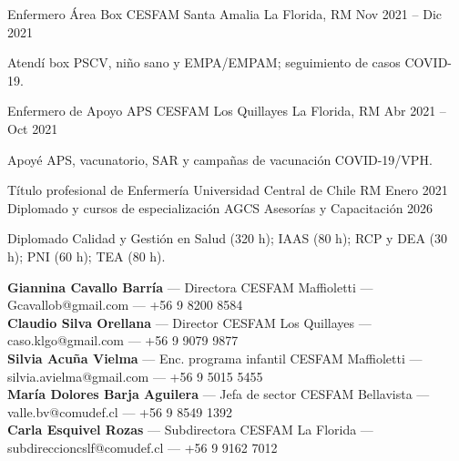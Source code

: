 \documentclass[11pt,a4paper]{awesome-cv}
\begin{document}
\begin{cventries}
{    }
  \cventry
    {Enfermero Área Box}
    {CESFAM Santa Amalia}
    {La Florida, RM}
    {Nov 2021 -- Dic 2021}
    {
      \begin{cvitems}
        \item {Atendí box PSCV, niño sano y EMPA/EMPAM; seguimiento de casos COVID-19.}
      \end{cvitems}
    }
  \cventry
    {Enfermero de Apoyo APS}
    {CESFAM Los Quillayes}
    {La Florida, RM}
    {Abr 2021 -- Oct 2021}
    {
      \begin{cvitems}
        \item {Apoyé APS, vacunatorio, SAR y campañas de vacunación COVID-19/VPH.}
      \end{cvitems}
    }
\end{cventries}

\begin{cventries}
  \cventry
    {Título profesional de Enfermería}
    {Universidad Central de Chile}
    {RM}
    {Enero 2021}
    {}
  \cventry
    {Diplomado y cursos de especialización}
    {AGCS Asesorías y Capacitación}
    {}
    {2026}
    {
      \begin{cvitems}
        \item {Diplomado Calidad y Gestión en Salud (320 h); IAAS (80 h); RCP y DEA (30 h); PNI (60 h); TEA (80 h).}
      \end{cvitems}
    }
\end{cventries}

\begin{cvskills}
\end{cvskills}

\begin{cvparagraph}
\textbf{Giannina Cavallo Barría} — Directora CESFAM Maffioletti — Gcavallob@gmail.com — +56 9 8200 8584\\
\textbf{Claudio Silva Orellana} — Director CESFAM Los Quillayes — caso.klgo@gmail.com — +56 9 9079 9877\\
\textbf{Silvia Acuña Vielma} — Enc. programa infantil CESFAM Maffioletti — silvia.avielma@gmail.com — +56 9 5015 5455\\
\textbf{María Dolores Barja Aguilera} — Jefa de sector CESFAM Bellavista — valle.bv@comudef.cl — +56 9 8549 1392\\
\textbf{Carla Esquivel Rozas} — Subdirectora CESFAM La Florida — subdireccioncslf@comudef.cl — +56 9 9162 7012
\end{cvparagraph}
\end{document}
